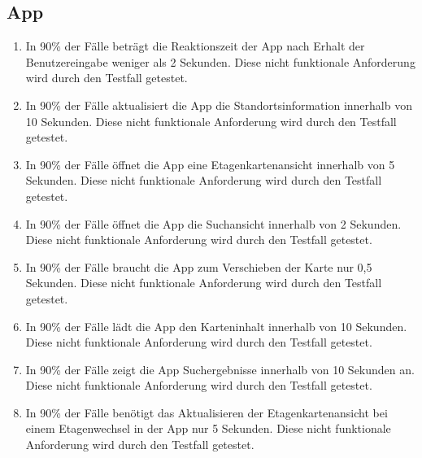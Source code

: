 \subsection*{App}

\begin{samepage}
    \begin{enumerate}[label=\textbf{/NFL\arabic*0/}, align=left]
        \item \label{/NFL10/} In 90\% der Fälle beträgt die \Gls{Reaktionszeit} der App nach Erhalt der \Gls{Benutzereingabe} weniger als 2 Sekunden. Diese nicht funktionale Anforderung wird durch den Testfall  getestet.
        \item \label{/NFL20/} In 90\% der Fälle aktualisiert die App die Standortsinformation innerhalb von 10 Sekunden. Diese nicht funktionale Anforderung wird durch den Testfall  getestet.
        \item \label{/NFL30/} In 90\% der Fälle öffnet die App eine \Gls{Etagenkartenansicht} innerhalb von 5 Sekunden. Diese nicht funktionale Anforderung wird durch den Testfall  getestet.
        \item \label{/NFL40/} In 90\% der Fälle öffnet die App die \Gls{Suchansicht} innerhalb von 2 Sekunden. Diese nicht funktionale Anforderung wird durch den Testfall  getestet.
        \item \label{/NFL50/} In 90\% der Fälle braucht die App zum Verschieben der \Gls{Karte} nur 0,5 Sekunden. Diese nicht funktionale Anforderung wird durch den Testfall  getestet.
        \item \label{/NFL60/} In 90\% der Fälle lädt die App den Karteninhalt innerhalb von 10 Sekunden. Diese nicht funktionale Anforderung wird durch den Testfall  getestet.
        \item \label{/NFL70/} In 90\% der Fälle zeigt die App Suchergebnisse innerhalb von 10 Sekunden an. Diese nicht funktionale Anforderung wird durch den Testfall  getestet.
        \item \label{/NFL80/} In 90\% der Fälle benötigt das Aktualisieren der \Gls{Etagenkartenansicht} bei einem \Gls{Etagenwechsel} in der App nur 5 Sekunden. Diese nicht funktionale Anforderung wird durch den Testfall  getestet.
    \end{enumerate}
\end{samepage}